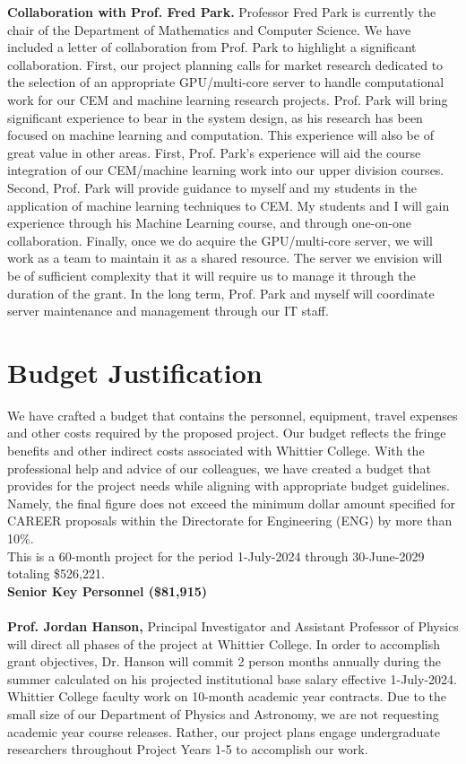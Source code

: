 \documentclass[11pt]{amsart}
\begin{document}
\textbf{Collaboration with Prof. Fred Park.} Professor Fred Park is currently the chair of the Department of Mathematics and Computer Science.  We have included a letter of collaboration from Prof. Park to highlight a significant collaboration.  First, our project planning calls for market research dedicated to the selection of an appropriate GPU/multi-core server to handle computational work for our CEM and machine learning research projects.  Prof. Park will bring significant experience to bear in the system design, as his research has been focused on machine learning and computation.  This experience will also be of great value in other areas.  First, Prof. Park's experience will aid the course integration of our CEM/machine learning work into our upper division courses.  Second, Prof. Park will provide guidance to myself and my students in the application of machine learning techniques to CEM.  My students and I will gain experience through his Machine Learning course, and through one-on-one collaboration.  Finally, once we do acquire the GPU/multi-core server, we will work as a team to maintain it as a shared resource.  The server we envision will be of sufficient complexity that it will require us to manage it through the duration of the grant.  In the long term, Prof. Park and myself will coordinate server maintenance and management through our IT staff.

\clearpage

\section{Budget Justification}

We have crafted a budget that contains the personnel, equipment, travel expenses and other costs required by the proposed project. Our budget reflects the fringe benefits and other indirect costs associated with Whittier College. With the professional help and advice of our colleagues, we have created a budget that provides for the project needs while aligning with appropriate budget guidelines. Namely, the final figure does not exceed the minimum dollar amount specified for CAREER proposals within the Directorate for Engineering (ENG) by more than 10\%. \\

\noindent
This is a 60-month project for the period 1-July-2024 through 30-June-2029 totaling \$526,221. \\

\noindent
\textbf{Senior Key Personnel (\$81,915)} \\ \\
\textbf{Prof. Jordan Hanson,} Principal Investigator and Assistant Professor of Physics will direct all phases of the project at Whittier College. In order to accomplish grant objectives, Dr. Hanson will commit 2 person months annually during the summer calculated on his projected institutional base salary effective 1-July-2024. Whittier College faculty work on 10-month academic year contracts. Due to the small size of our Department of Physics and Astronomy, we are not requesting academic year course releases. Rather, our project plans engage undergraduate researchers throughout Project Years 1-5 to accomplish our work. \\
\end{document}
